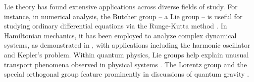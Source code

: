 Lie theory has found extensive applications across diverse fields of study. For instance, in numerical analysis, the Butcher group -- a Lie group -- is useful for studying ordinary differential equations via the Runge-Kutta method \citep{Bogfjellmo2017}. In Hamiltonian mechanics, it has been employed to analyze complex dynamical systems, as demonstrated in \citet{Hamburger2009}, with applications including the harmonic oscillator and Kepler's problem. Within quantum physics, Lie groups help explain unusual transport phenomena observed in physical systems \citep{Ilievski2021}. The Lorentz group and the special orthogonal group feature prominently in discussions of quantum gravity \citep{Dreyer2003,Kapec2017}.

